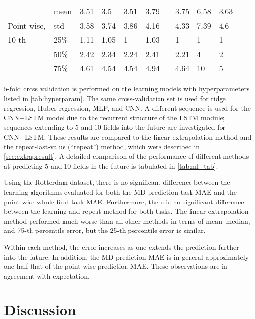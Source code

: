 \begin{table}[t]
\begin{tabular}{@{}llllllllll@{}}
		\midrule
		& mean & 3.51  & 3.5   & 3.51 & 3.79 &          & 3.75      & 6.58   & 3.63   \\
		Point-wise, & std  & 3.58  & 3.74  & 3.86 & 4.16 &          & 4.33      & 7.39   & 4.6    \\
		10-th& 25\% & 1.11  & 1.05  & 1    & 1.03 &          & 1         & 1      & 1      \\
		& 50\% & 2.42  & 2.34  & 2.24 & 2.41 &          & 2.21      & 4      & 2      \\
		& 75\% & 4.61  & 4.54  & 4.54 & 4.94 &          & 4.64      & 10     & 5      \\ \bottomrule
	\end{tabular}
\end{table}

5-fold cross validation is performed on the learning models with hyperparameters listed in \cref{tab:hyperparam}. The same cross-validation set is used for ridge regression, Huber regression, \ac{MLP}, and \ac{CNN}. A different sequence is used for the \acs{CNN}+\acs{LSTM} model due to the recurrent structure of the \ac{LSTM} module; sequences extending to 5 and 10 fields into the future are investigated for \acs{CNN}+\acs{LSTM}. These results are compared to the linear extrapolation method and the repeat-last-value (``repeat'') method, which were described in \cref{sec:extrapresult}. A detailed comparison of the performance of different methods at predicting 5 and 10 fields in the future is tabulated in \cref{tab:ml_tab}.

Using the Rotterdam dataset, there is no significant difference between the learning algorithms evaluated for both the \ac{MD} prediction task \ac{MAE} and the point-wise whole field task \ac{MAE}. Furthermore, there is no significant difference between the learning and repeat method for both tasks. The linear extrapolation method performed much worse than all other methods in terms of mean, median, and 75-th percentile error, but the 25-th percentile error is similar. 

Within each method, the error increases as one extends the prediction further into the future. In addition, the \ac{MD} prediction \ac{MAE} is in general approximately one half that of the point-wise prediction \ac{MAE}. These observations are in agreement with expectation. 

\section{Discussion}

